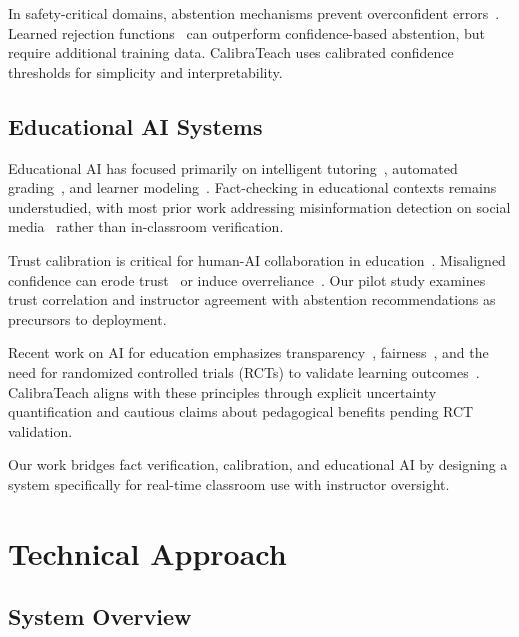 \documentclass[journal]{IEEEtran}
\begin{document}
In safety-critical domains, abstention mechanisms prevent overconfident errors~\cite{Raghu2019,Begoli2019}. Learned rejection functions~\cite{Cortes2016} can outperform confidence-based abstention, but require additional training data. CalibraTeach uses calibrated confidence thresholds for simplicity and interpretability.

\subsection{Educational AI Systems}

Educational AI has focused primarily on intelligent tutoring~\cite{Koedinger2012,VanLehn2011}, automated grading~\cite{Attali2006,Ramachandran2015}, and learner modeling~\cite{Corbett1994,Piech2015}. Fact-checking in educational contexts remains understudied, with most prior work addressing misinformation detection on social media~\cite{Shu2017,Zubiaga2018} rather than in-classroom verification.

Trust calibration is critical for human-AI collaboration in education~\cite{Holstein2019,Khosravi2022}. Misaligned confidence can erode trust~\cite{Yin2019} or induce overreliance~\cite{Kaur2020}. Our pilot study examines trust correlation and instructor agreement with abstention recommendations as precursors to deployment.

Recent work on AI for education emphasizes transparency~\cite{Conati2021}, fairness~\cite{Baker2022}, and the need for randomized controlled trials (RCTs) to validate learning outcomes~\cite{Reich2020}. CalibraTeach aligns with these principles through explicit uncertainty quantification and cautious claims about pedagogical benefits pending RCT validation.

Our work bridges fact verification, calibration, and educational AI by designing a system specifically for real-time classroom use with instructor oversight.


\section{Technical Approach}

\subsection{System Overview}
\end{document}
